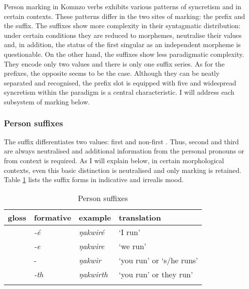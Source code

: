 Person marking in Komnzo verbs exhibits various patterns of syncretism and  in certain contexts. These patterns differ in the two sites of  marking: the prefix and the suffix. The suffixes show more complexity in their syntagmatic distribution: under certain conditions they are reduced to  morphemes, neutralise their  values and, in addition, the status of the first singular as an independent morpheme is questionable. On the other hand, the suffixes show less paradigmatic complexity. They encode only two  values and there is only one suffix series. As for the prefixes, the opposite seems to be the case. Although they can be neatly separated and recognised, the prefix slot is equipped with five  and widespread syncretism within the paradigm is a central characteristic. I will address each subsystem of  marking below.

\subsubsection{Person suffixes} \label{personsuffsection}

The  suffix differentiates two  values: first and non-first . Thus, second and third  are always neutralised and additional information from the personal pronouns or from context is required. As I will explain below, in certain morphological contexts, even this basic distinction is neutralised and only  marking is retained. Table \ref{perssuff} lists the suffix forms in indicative and irrealis mood.

\begin{table}
\caption{Person suffixes}
\label{perssuff}
	\begin{tabularx}{\textwidth}{XXXl}
		\lsptoprule
		{gloss} & {formative} & {example} &{translation}\\\midrule
		\Fsg &\emph{-é} &\emph{ŋakwiré}	&`I run'\\
		\Fnsg &\emph{-e} &\emph{ŋakwire} &`we run'\\
		\Stsg &-\Zero &\emph{ŋakwir} &`you run' or `s/he runs'\\
		\Stnsg &\emph{-th} &\emph{ŋakwirth}	&`you run' or they run'\\
		\lspbottomrule
	\end{tabularx}
\end{table}%

